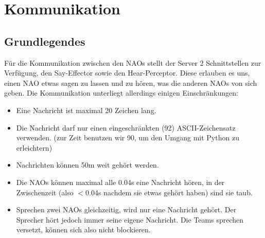 \section{Kommunikation}
\subsection{Grundlegendes}
Für die Kommunikation zwischen den NAOs stellt der Server 2 
Schnittstellen zur Verfügung, den Say-Effector sowie den Hear-Perceptor.
 Diese erlauben es uns, einen NAO etwas sagen zu lassen und zu hören, 
was die anderen NAOs von sich geben. Die Kommunikation unterliegt 
allerdings einigen Einschränkungen:

\begin{itemize}
\item  Eine Nachricht ist maximal 20 Zeichen lang.
\item  Die Nachricht darf nur einen eingeschränkten (92) 
ASCII-Zeichensatz verwenden. (zur Zeit benutzen wir 90, um den Umgang 
mit Python zu erleichtern)
\item  Nachrichten können 50m weit gehört werden.
\item  Die NAOs können maximal alle 0.04s eine Nachricht hören, in 
der Zwischenzeit (also $<$0.04s nachdem sie etwas gehört haben) sind 
sie taub.
\item  Sprechen zwei NAOs gleichzeitig, wird nur eine Nachricht 
gehört. Der Sprecher hört jedoch immer seine eigene Nachricht. Die Teams
 sprechen versetzt, können sich also nicht blockieren.
\end{itemize}

